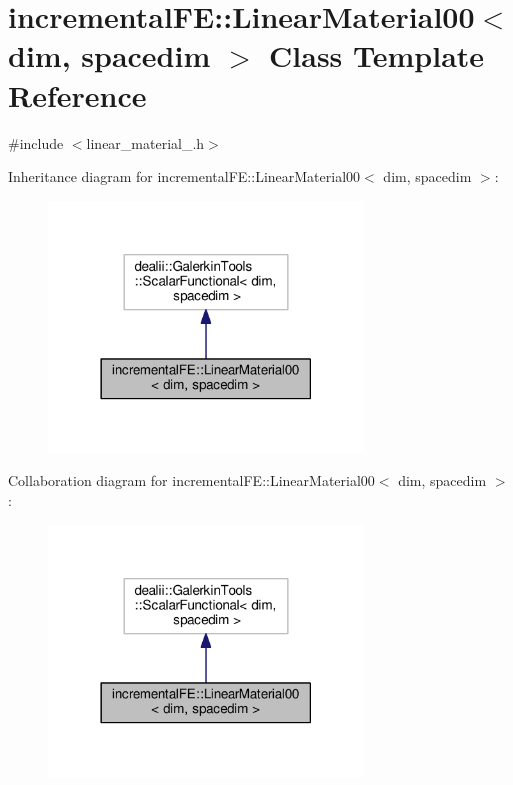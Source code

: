 \hypertarget{classincremental_f_e_1_1_linear_material00}{}\section{incremental\+FE\+:\+:Linear\+Material00$<$ dim, spacedim $>$ Class Template Reference}
\label{classincremental_f_e_1_1_linear_material00}


{\ttfamily \#include $<$linear\+\_\+material\+\_.\+h$>$}



Inheritance diagram for incremental\+FE\+:\+:Linear\+Material00$<$ dim, spacedim $>$\+:\nopagebreak
\begin{figure}[H]
\begin{center}
\leavevmode
\includegraphics[width=237pt]{classincremental_f_e_1_1_linear_material00__inherit__graph}
\end{center}
\end{figure}


Collaboration diagram for incremental\+FE\+:\+:Linear\+Material00$<$ dim, spacedim $>$\+:\nopagebreak
\begin{figure}[H]
\begin{center}
\leavevmode
\includegraphics[width=237pt]{classincremental_f_e_1_1_linear_material00__coll__graph}
\end{center}
\end{figure}
